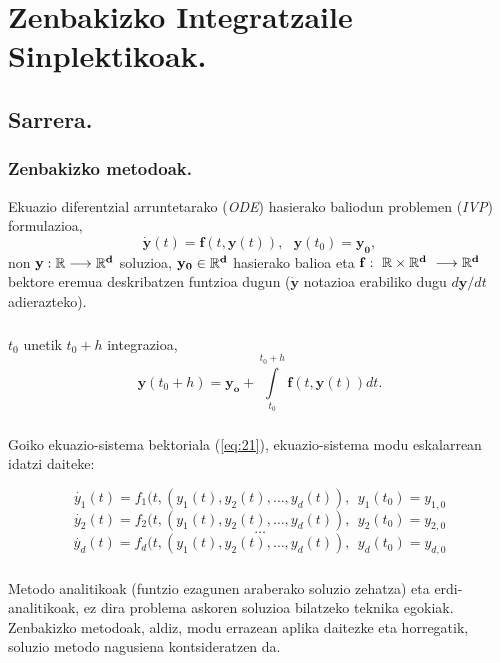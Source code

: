 \chapter{Zenbakizko Integratzaile Sinplektikoak.}

\section{Sarrera.}

\subsection{Zenbakizko metodoak.}

Ekuazio diferentzial arruntetarako (\emph{ODE}) hasierako baliodun problemen (\emph{IVP}) formulazioa,
\begin{equation}
\label{eq:21}
\dot{\mathbf{y}}(t)=\mathbf{f}(t,\mathbf{y}(t)),\ \ \ \mathbf{y}(t_0)=\mathbf{y_0}, 
\end{equation}
non  $\bf{y}: \mathbb{R} \longrightarrow {\mathbb{R}}^d$ soluzioa, $\bf{y_0} \in \mathbb{R}^d$ hasierako balioa eta $\bf{f}: \ \mathbb{R} \times {\mathbb{R}}^d \ \longrightarrow {\mathbb{R}}^d$ bektore eremua deskribatzen funtzioa dugun ($\dot{\mathbf{y}}$ notazioa erabiliko dugu $d\mathbf{y}/dt$ adierazteko).

\paragraph*{} $t_0$ unetik $t_0+h$ integrazioa,
\begin{equation*}
\mathbf{y}(t_0+h)=\mathbf{y_o}+\int\limits_{t_0}^{t_0+h} \mathbf{f}(t,\mathbf{y}(t)) dt.
\end{equation*}

\paragraph*{}Goiko ekuazio-sistema bektoriala (\ref{eq:21}), ekuazio-sistema modu eskalarrean idatzi daiteke:

\[\dot{y_1}(t)=f_1(t,(y_1(t),y_2(t),\dots,y_d(t)), \ \ y_1(t_0)=y_{1,0}\]
\[\dot{y_2}(t)=f_2(t,(y_1(t),y_2(t),\dots,y_d(t)), \ \ y_2(t_0)=y_{2,0}\]
\[\dots\]
\[\dot{y_d}(t)=f_d(t,(y_1(t),y_2(t),\dots,y_d(t)),  \ \ y_d(t_0)=y_{d,0}\]


\paragraph*{} Metodo analitikoak (funtzio ezagunen araberako soluzio zehatza) eta erdi-analitikoak, ez dira problema askoren soluzioa bilatzeko teknika egokiak. Zenbakizko metodoak, aldiz, modu errazean aplika daitezke eta horregatik, soluzio metodo nagusiena kontsideratzen da. 


